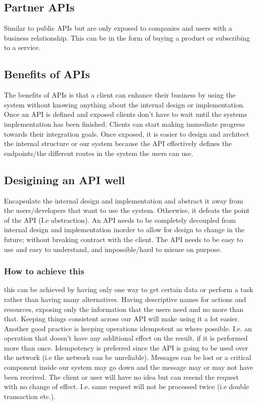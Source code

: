 \subsection{Partner APIs}
Similar to public APIs but are only exposed to companies and users with a business relationship.
This can be in the form of buying a product or subscribing to a service.

\subsection{Benefits of APIs}
The benefits of APIs is that a client can enhance their business by using the system without knowing anything about the internal design or implementation.
Once an API is defined and exposed clients don't have to wait until the systems implementation has been finished.
Clients can start making immediate progress towards their integration goals.
Once exposed, it is easier to design and architect the internal structure or our system because the API effectively defines the endpoints/the different routes in the system the users can use.

\subsection{Desigining an API well}
Encapsulate the internal design and implementation and abstract it away from the users/developers that want to use the system.
Otherwise, it defeats the point of the API (I.e abstraction).
An API needs to be completely decoupled from internal design and implementation inorder to allow for design to change in the future; without breaking contract with the client.
The API needs to be easy to use and easy to understand, and impossible/hard to misuse on purpose.

\subsubsection{How to achieve this}
this can be achieved by having only one way to get certain data or perform a task rather than having many alternatives.
Having descriptive names for actions and resources, exposing only the information that the users need and no more than that.
Keeping things consistent across our API will make using it a lot easier.
Another good practice is keeping operations idempotent as where possible.
I.e. an operation that doesn't have any additional effect on the result, if it is performed more than once.
Idempotency is preferred since the API is going to be used over the network (i.e the network can be unreliable).
Messages can be lost or a critical component inside our system may go down and the message may or may not have been received.
The client or user will have no idea but can resend the request with no change of effect.
I.e. same request will not be processed twice (i.e double transaction etc.).

